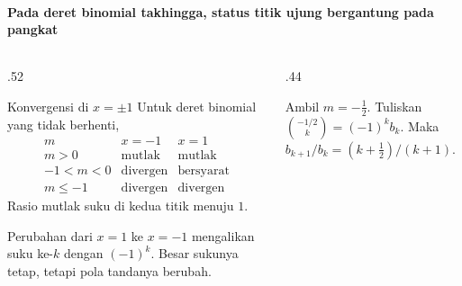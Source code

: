 \documentclass{../../kalkulus-ppt}
\begin{document}
\begin{frame}{\insertsection}
    \framesubtitle{Pada deret binomial takhingga, status titik ujung bergantung pada pangkat}
    \begin{columns}[c,onlytextwidth]
        \begin{column}{.52\textwidth}
            \begin{block}{Konvergensi di $x=\pm1$}
                Untuk deret binomial yang tidak berhenti,
                \[
                    \begin{array}{c|c|c}
                        m & x=-1 & x=1\\ \hline
                        m>0 & \text{mutlak} & \text{mutlak}\\
                        -1<m<0 & \text{divergen} & \text{bersyarat}\\
                        m\le-1 & \text{divergen} & \text{divergen}
                    \end{array}
                \]
                Rasio mutlak suku di kedua titik menuju $1$.
            \end{block}
            Perubahan dari $x=1$ ke $x=-1$ mengalikan suku
            ke-$k$ dengan $(-1)^k$. Besar sukunya tetap,
            tetapi pola tandanya berubah.
        \end{column}
        \begin{column}{.44\textwidth}
            \begin{contoh}
                Ambil $m=-\tfrac12$. Tuliskan
                $\binom{-1/2}{k}=(-1)^k b_k$.
                Maka $b_{k+1}/b_k=(k+\tfrac12)/(k+1)$.
            \end{contoh}
        \end{column}
    \end{columns}
\end{frame}
\end{document}
